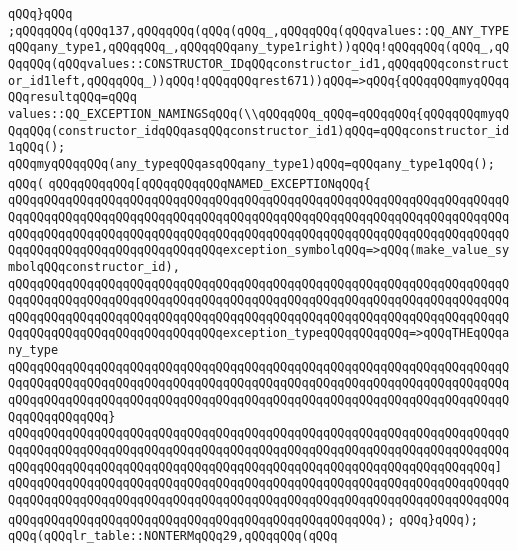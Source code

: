 \verb|qQQq}qQQq|\newline
\verb|;qQQqqQQq(qQQq137,qQQqqQQq(qQQq(qQQq_,qQQqqQQq(qQQqvalues::QQ_ANY_TYPEqQQqany_type1,qQQqqQQq_,qQQqqQQqany_type1right))qQQq!qQQqqQQq(qQQq_,qQQqqQQq(qQQqvalues::CONSTRUCTOR_IDqQQqconstructor_id1,qQQqqQQqconstructor_id1left,qQQqqQQq_))qQQq!qQQqqQQqrest671))qQQq=>qQQq{qQQqqQQqmyqQQqqQQqresultqQQq=qQQq|\newline
\verb|values::QQ_EXCEPTION_NAMINGSqQQq(\\qQQqqQQq_qQQq=qQQqqQQq{qQQqqQQqmyqQQqqQQq(constructor_idqQQqasqQQqconstructor_id1)qQQq=qQQqconstructor_id1qQQq();|\newline
\verb|qQQqmyqQQqqQQq(any_typeqQQqasqQQqany_type1)qQQq=qQQqany_type1qQQq();|\newline
\verb|qQQq(|\newline
\verb|qQQqqQQqqQQq[qQQqqQQqqQQqNAMED_EXCEPTIONqQQq{|\newline
\verb|qQQqqQQqqQQqqQQqqQQqqQQqqQQqqQQqqQQqqQQqqQQqqQQqqQQqqQQqqQQqqQQqqQQqqQQqqQQqqQQqqQQqqQQqqQQqqQQqqQQqqQQqqQQqqQQqqQQqqQQqqQQqqQQqqQQqqQQqqQQqqQQqqQQqqQQqqQQqqQQqqQQqqQQqqQQqqQQqqQQqqQQqqQQqqQQqqQQqqQQqqQQqqQQqqQQqqQQqqQQqqQQqqQQqqQQqqQQqqQQqexception_symbolqQQq=>qQQq(make_value_symbolqQQqconstructor_id),|\newline
\verb|qQQqqQQqqQQqqQQqqQQqqQQqqQQqqQQqqQQqqQQqqQQqqQQqqQQqqQQqqQQqqQQqqQQqqQQqqQQqqQQqqQQqqQQqqQQqqQQqqQQqqQQqqQQqqQQqqQQqqQQqqQQqqQQqqQQqqQQqqQQqqQQqqQQqqQQqqQQqqQQqqQQqqQQqqQQqqQQqqQQqqQQqqQQqqQQqqQQqqQQqqQQqqQQqqQQqqQQqqQQqqQQqqQQqqQQqqQQqqQQqexception_typeqQQqqQQqqQQq=>qQQqTHEqQQqany_type|\newline
\verb|qQQqqQQqqQQqqQQqqQQqqQQqqQQqqQQqqQQqqQQqqQQqqQQqqQQqqQQqqQQqqQQqqQQqqQQqqQQqqQQqqQQqqQQqqQQqqQQqqQQqqQQqqQQqqQQqqQQqqQQqqQQqqQQqqQQqqQQqqQQqqQQqqQQqqQQqqQQqqQQqqQQqqQQqqQQqqQQqqQQqqQQqqQQqqQQqqQQqqQQqqQQqqQQqqQQqqQQqqQQqqQQq}|\newline
\verb|qQQqqQQqqQQqqQQqqQQqqQQqqQQqqQQqqQQqqQQqqQQqqQQqqQQqqQQqqQQqqQQqqQQqqQQqqQQqqQQqqQQqqQQqqQQqqQQqqQQqqQQqqQQqqQQqqQQqqQQqqQQqqQQqqQQqqQQqqQQqqQQqqQQqqQQqqQQqqQQqqQQqqQQqqQQqqQQqqQQqqQQqqQQqqQQqqQQqqQQqqQQqqQQq]|\newline
\verb|qQQqqQQqqQQqqQQqqQQqqQQqqQQqqQQqqQQqqQQqqQQqqQQqqQQqqQQqqQQqqQQqqQQqqQQqqQQqqQQqqQQqqQQqqQQqqQQqqQQqqQQqqQQqqQQqqQQqqQQqqQQqqQQqqQQqqQQqqQQqqQQqqQQqqQQqqQQqqQQqqQQqqQQqqQQqqQQqqQQqqQQqqQQqqQQq);|\newline
\verb|qQQq}qQQq);|\newline
\verb|qQQq(qQQqlr_table::NONTERMqQQq29,qQQqqQQq(qQQq|\newline
